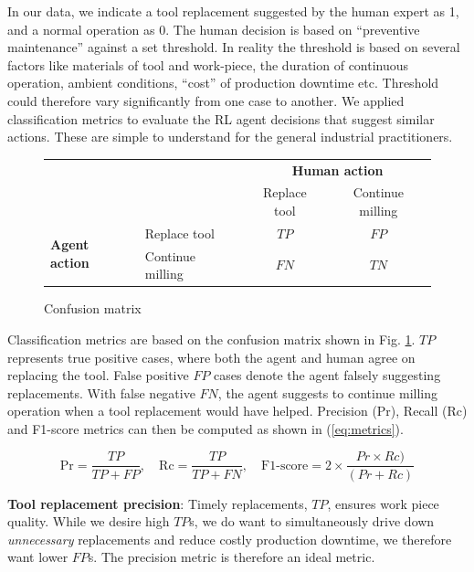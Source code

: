 \documentclass[a4paper, 12pt]{article}
\newcommand{\rowspace}[1]{\renewcommand{\arraystretch}{#1}}
\begin{document}
In our data, we indicate a tool replacement suggested by the human expert as 1, and a normal operation as 0. The human decision is based on ``preventive maintenance'' against a set threshold. In reality the threshold is based on several factors like materials of tool and work-piece, the duration of continuous operation, ambient conditions, ``cost'' of production downtime etc. Threshold could therefore vary significantly from one case to another. We applied  classification metrics to evaluate the RL agent decisions that suggest similar actions. These are simple to understand for the general industrial practitioners.
 
\begin{figure}
	\begin{center}
		\sffamily
		\rowspace{1.6}
		\begin{tabular}{l|l|c|c|}
			\multicolumn{2}{c}{}&\multicolumn{2}{c}{\textbf{Human action}}\\
			\cline{3-4}
			\multicolumn{2}{c|}{}&Replace tool&Continue milling\\
			\cline{2-4}
			\multirow{2}{*}{\textbf{Agent action}}& Replace tool & $TP$ & $FP$\\
			\cline{2-4}
			& Continue milling& $FN$ & $TN$\\
			\cline{2-4}
		\end{tabular}
	\end{center}
	\caption{Confusion matrix }
	\label{fig:CM}	
\end{figure}
Classification metrics are based on the confusion matrix shown in Fig. \ref{fig:CM}. $TP$ represents true positive cases, where both the agent and human agree on replacing the tool. False positive $FP$ cases denote the agent falsely suggesting replacements. With false negative $FN$, the agent suggests to continue milling operation when a tool replacement would have helped. Precision (Pr), Recall (Rc) and F1-score metrics can then be computed as shown in (\ref{eq:metrics}).

\begin{equation}
	\text{Pr} = \frac{TP}{TP+FP}, \quad
	\text{Rc} = \frac{TP}{TP+FN}, \quad
	\text{F1-score} = 2 \times \frac{Pr \times Rc)}{(Pr + Rc)}
	\label{eq:metrics}
\end{equation}

\textbf{Tool replacement precision}: Timely replacements, $TP$, ensures work piece quality. While we desire high $TP$s, we do want to simultaneously drive down \textit{unnecessary} replacements and reduce costly production downtime, we therefore want lower $FP$s. The precision metric is therefore an ideal metric. 
\end{document}
